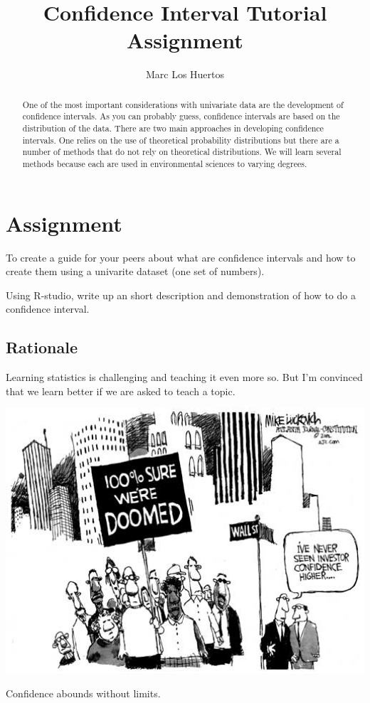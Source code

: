 \documentclass{tufte-handout}\usepackage[]{graphicx}\usepackage[]{color}
\title{Confidence Interval Tutorial Assignment %
}
\author[Marc Los Huertos]{Marc Los Huertos}
\begin{document}

\maketitle%
\begin{abstract}
\noindent One of the most important considerations with univariate data are the development of confidence intervals. As you can probably guess, confidence intervals are based on the distribution of the data. There are two main approaches in developing confidence intervals. One relies on the use of theoretical probability distributions but there are a number of methods that do not rely on theoretical distributions. We will learn several methods because each are used in environmental sciences to varying degrees.
\end{abstract}




\section{Assignment}

To create a guide for your peers about what are confidence intervals and how to create them using a univarite dataset (one set of numbers). 

Using R-studio, write up an short description and demonstration of how to do a confidence interval.

\subsection{Rationale}

Learning statistics is challenging and teaching it even more so. But I'm convinced that we learn better if we are asked to teach a topic. 

\begin{marginfigure}
	\centering
		\includegraphics[width=1.00\textwidth]{Investor_confidence500.jpg}
	\caption{Confidence abounds without limits.}
	\label{fig:Investor_confidence500}
\end{marginfigure}
\end{document}
